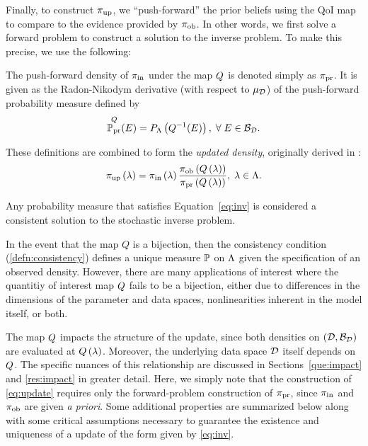 Finally, to construct $\operatorname*{\pi_{up}}$, we ``push-forward'' the prior beliefs using the QoI map to compare to the evidence provided by $\operatorname*{\pi_{ob}}$. 
In other words, we first solve a forward problem to construct a solution to the inverse problem. 
To make this precise, we use the following:

\begin{defn}\label{defn:predicted}
The push-forward density of $\operatorname*{\pi_{in}}$ under the map $Q$ is denoted simply as $\operatorname*{\pi_{pr}}$. 
It is given as the Radon-Nikodym derivative (with respect to $\mu_{\mathcal{D}}$) of the push-forward probability measure defined by 
\begin{equation}\label{eq:predicted}
\operatorname*{\mathbb{P}_{pr}}^Q (E)  = P_{\Lambda} \left ( Q^{-1}(E) \right ), \; \forall \; E \in \mathcal{B}_{\mathcal{D}}.
\end{equation}
\end{defn}

These definitions are combined to form the \emph{updated density}, originally derived in \cite{BJW18}:
\begin{equation}\label{eq:update}
\operatorname*{\pi_{up}} \left ( \lambda \right ) = \operatorname*{\pi_{in}} \left ( \lambda \right ) \frac{\operatorname*{\pi_{ob}} \left ( Q\left ( \lambda \right ) \right ) }{\operatorname*{\pi_{pr}} \left ( Q\left ( \lambda \right ) \right ) }, \; \lambda \in {\Lambda}.
\end{equation}

Any probability measure that satisfies Equation~\ref{eq:inv} is considered a consistent solution to the stochastic inverse problem.

In the event that the map $Q$ is a bijection, then the consistency condition (\ref{defn:consistency}) defines a unique measure $\mathbb{P}$ on ${\Lambda}$ given the specification of an observed density.
However, there are many applications of interest where the quantitiy of interest map $Q$ fails to be a bijection, either due to differences in the dimensions of the parameter and data spaces, nonlinearities inherent in the model itself, or both. 

The map $Q$ impacts the structure of the update, since both densities on $(\mathcal{D}, \mathcal{B}_{\mathcal{D}})$ are evaluated at $Q\left ( \lambda \right )$.
Moreover, the underlying data space $\mathcal{D}$ itself depends on $Q$.
The specific nuances of this relationship are discussed in Sections~\ref{que:impact} and \ref{res:impact} in greater detail.
Here, we simply note that the construction of \eqref{eq:update} requires only the forward-problem construction of $\operatorname*{\pi_{pr}}$, since $\operatorname*{\pi_{in}}$ and $\operatorname*{\pi_{ob}}$ are given \emph{a priori}.
Some additional properties are summarized below along with some critical assumptions necessary to guarantee the existence and uniqueness of a update of the form given by \eqref{eq:inv}. 